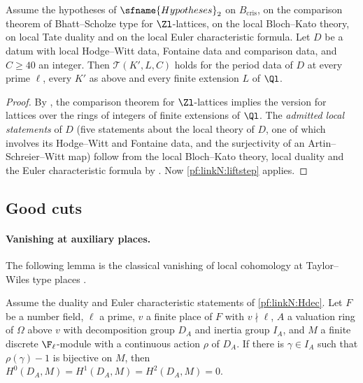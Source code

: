 \begin{theorem}\label{pf:linkN:thmT}
Assume the hypotheses of $\sfname{Hypotheses}_2$ on $B_{\mathrm{cris}}$, on the comparison theorem of Bhatt--Scholze type for $\Zl$-lattices, on the
local Bloch--Kato theory, on local Tate duality and on the local Euler characteristic formula. Let $D$ be a datum with local Hodge--Witt data,
Fontaine data and comparison data, and $C\ge40$ an integer. Then $\mathcal T(K',L,C)$ holds for the period data of $D$ at every prime $\ell$, every
$K'$ as above and every finite extension $L$ of $\Ql$.
\end{theorem}

\begin{proof}
By , the comparison theorem for $\Zl$-lattices implies the version for
lattices over the rings of integers of finite extensions of $\Ql$. The \emph{admitted local statements} of $D$ (five statements about the
local theory of $D$, one of which involves its Hodge--Witt and Fontaine data, and the surjectivity of an Artin--Schreier--Witt
map) follow from the local Bloch--Kato
theory, local duality and the Euler characteristic formula by . Now
\cref{pf:linkN:liftstep} applies.
\end{proof}

\subsection{Good cuts}\label{sec:pf:linkN:goodcuts}

\paragraph{Vanishing at auxiliary places.}
The following lemma is the classical vanishing of local cohomology at Taylor--Wiles type places
\cite[\S2]{DarmonDiamondTaylor1997}.

\begin{lemma}\label{pf:linkN:tamevanish}
Assume the duality and Euler characteristic statements of \cref{pf:linkN:Hdec}. Let $F$ be a number field, $\ell$ a prime, $v$ a
finite place of $F$ with $v\nmid\ell$, $A$ a valuation ring of $\Omega$ above $v$ with decomposition group $D_A$ and inertia group
$I_A$, and $M$ a finite discrete $\F_\ell$-module with a continuous action $\rho$ of $D_A$. If there is $\gamma\in I_A$ such that
$\rho(\gamma)-1$ is bijective on $M$, then $H^0(D_A,M)=H^1(D_A,M)=H^2(D_A,M)=0$.
\end{lemma}

